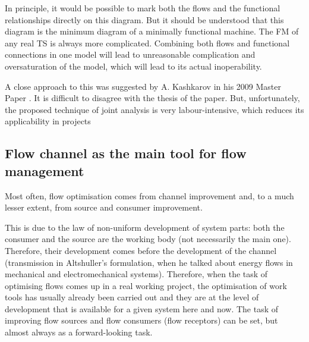 \documentclass[a4paper,11pt]{article}
\begin{document}
In principle, it would be possible to mark both the flows and the functional
relationships directly on this diagram. But it should be understood that this
diagram is the minimum diagram of a minimally functional machine. The FM of
any real TS is always more complicated. Combining both flows and functional
connections in one model will lead to unreasonable complication and
oversaturation of the model, which will lead to its actual inoperability.

A close approach to this was suggested by A. Kashkarov in his 2009 Master
Paper \cite{B11}. It is difficult to disagree with the thesis of the paper.
But, unfortunately, the proposed technique of joint analysis is very
labour-intensive, which reduces its applicability in projects

\subsection{Flow channel as the main tool for flow management}

Most often, flow optimisation comes from channel improvement and, to a much
lesser extent, from source and consumer improvement.

This is due to the law of non-uniform development of system parts: both the
consumer and the source are the working body (not necessarily the main
one). Therefore, their development comes before the development of the channel
(transmission in Altshuller's formulation, when he talked about energy flows
in mechanical and electromechanical systems). Therefore, when the task of
optimising flows comes up in a real working project, the optimisation of work
tools has usually already been carried out and they are at the level of
development that is available for a given system here and now. The task of
improving flow sources and flow consumers (flow receptors) can be set, but
almost always as a forward-looking task.
\end{document}
